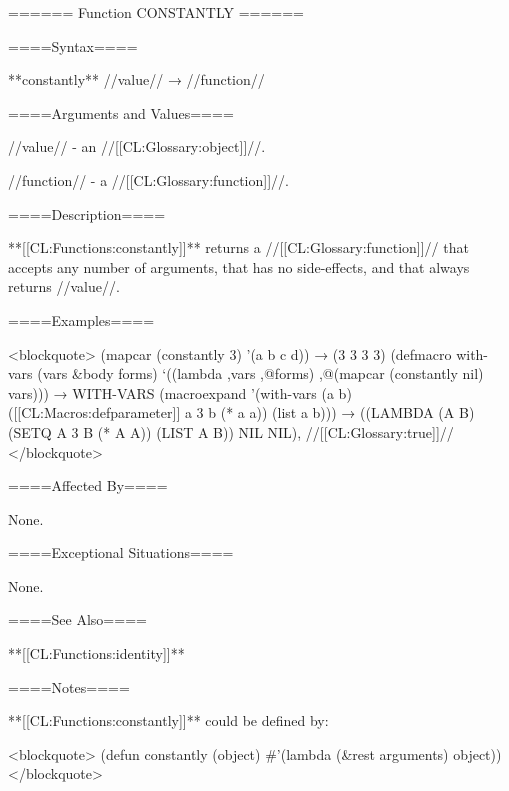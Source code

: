 ====== Function CONSTANTLY ======

====Syntax====

**constantly** //value// → //function//

====Arguments and Values====

//value// - an //[[CL:Glossary:object]]//.

//function// - a //[[CL:Glossary:function]]//.

====Description====

**[[CL:Functions:constantly]]** returns a //[[CL:Glossary:function]]// that accepts any number of arguments, that has no side-effects, and that always returns //value//.

====Examples====

<blockquote> (mapcar (constantly 3) '(a b c d)) → (3 3 3 3) (defmacro with-vars (vars &body forms) `((lambda ,vars ,@forms) ,@(mapcar (constantly nil) vars))) → WITH-VARS (macroexpand '(with-vars (a b) ([[CL:Macros:defparameter]] a 3 b (* a a)) (list a b))) → ((LAMBDA (A B) (SETQ A 3 B (* A A)) (LIST A B)) NIL NIL), //[[CL:Glossary:true]]// </blockquote>

====Affected By====

None.

====Exceptional Situations====

None.

====See Also====

**[[CL:Functions:identity]]**

====Notes====

**[[CL:Functions:constantly]]** could be defined by:

<blockquote> (defun constantly (object) #'(lambda (&rest arguments) object)) </blockquote>



